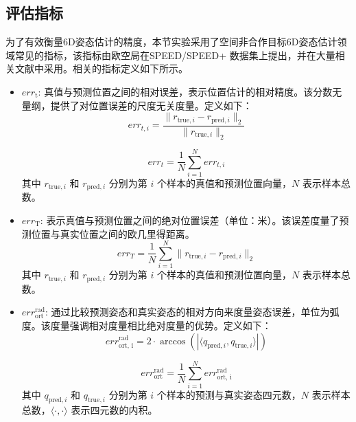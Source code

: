 \subsection{评估指标}
\label{subsec:est_indicator}
为了有效衡量6D姿态估计的精度，本节实验采用了空间非合作目标6D姿态估计领域常见的指标，该指标由欧空局在SPEED/SPEED+ 数据集上提出，并在大量相关文献中采用。相关的指标定义如下所示。
\begin{itemize}
	\item $err_{\text{t}}$: 真值与预测位置之间的相对误差，表示位置估计的相对精度。该分数无量纲，提供了对位置误差的尺度无关度量。定义如下：
	\begin{equation}
		err_{t,i} = \frac{\| r_{\text{true},i} - r_{\text{pred},i} \|_2}{\| r_{\text{true},i} \|_2}
	\end{equation}
	
	\begin{equation}
		err_t = \frac{1}{N} \sum\limits_{i=1}^{N} err_{t,i}
	\end{equation}
其中 $r_{\text{true},i}$ 和 $r_{\text{pred},i}$ 分别为第 $i$ 个样本的真值和预测位置向量，$N$ 表示样本总数。
	
	\item $err_{\text{T}}$: 表示真值与预测位置之间的绝对位置误差（单位：米）。该误差度量了预测位置与真实位置之间的欧几里得距离。
	\begin{equation}
		err_T = \frac{1}{N}\sum\limits_{i=1}^{N} \| r_{\text{true},i} - r_{\text{pred},i} \|_2
	\end{equation}
其中 $r_{\text{true},i}$ 和 $r_{\text{pred},i}$ 分别为第 $i$ 个样本的真值和预测位置向量，$N$ 表示样本总数。
	
	\item $err_{\text{ort}}^{\text{rad}}$: 通过比较预测姿态和真实姿态的相对方向来度量姿态误差，单位为弧度。该度量强调相对度量相比绝对度量的优势。定义如下：
	\begin{equation}
		err_{\text{ort, i}}^{\text{rad}} =  2 \cdot \arccos \left( \left| \langle q_{\text{pred},i}, q_{\text{true},i} \rangle \right| \right)
	\end{equation}
	
	\begin{equation}
		err_{\text{ort}}^{\text{rad}} = \frac{1}{N}\sum\limits_{i=1}^N err_{\text{ort, i}}^{\text{rad}}
	\end{equation}
	其中 $q_{\text{pred},i}$ 和 $q_{\text{true},i}$ 分别为第 $i$ 个样本的预测与真实姿态四元数，$N$ 表示样本总数，$\langle \cdot, \cdot \rangle$ 表示四元数的内积。
	

\end{itemize}

